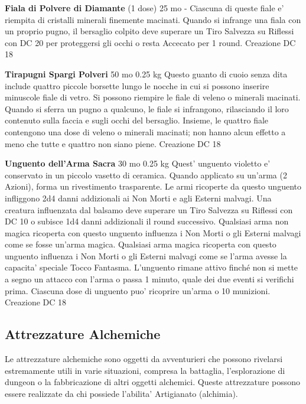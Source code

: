 \documentclass[a4paper,11pt,twoside,openany]{book}
\begin{document}
{\textbf{Fiala di Polvere di Diamante} (1 dose) 25 mo - Ciascuna di queste fiale e' riempita di cristalli minerali finemente macinati. Quando si infrange una fiala con un proprio pugno, il bersaglio colpito deve superare un Tiro Salvezza su Riflessi con DC 20 per proteggersi gli occhi o resta Accecato per 1 round. Creazione DC 18

\textbf{Tirapugni Spargi Polveri} 50 mo 0.25 kg Questo guanto di cuoio senza dita include quattro piccole borsette lungo le nocche in cui si possono inserire minuscole fiale di vetro. Si possono riempire le fiale di veleno o minerali macinati. Quando si sferra un pugno a qualcuno, le fiale si infrangono, rilasciando il loro contenuto sulla faccia e sugli occhi del bersaglio. Insieme, le quattro fiale contengono una dose di veleno o minerali macinati; non hanno alcun effetto a meno che tutte e quattro non siano piene. Creazione DC 18

\textbf{Unguento dell'Arma Sacra} 30 mo 0.25 kg Quest' unguento violetto e' conservato in un piccolo vasetto di ceramica. Quando applicato su un'arma (2 Azioni), forma un rivestimento trasparente. Le armi ricoperte da questo unguento infliggono 2d4 danni addizionali ai Non Morti e agli Esterni malvagi. Una creatura influenzata dal balsamo deve superare un Tiro Salvezza su Riflessi con DC 10 o subisce 1d4 danni addizionali il round successivo. Qualsiasi arma non magica ricoperta con questo unguento influenza i Non Morti o gli Esterni malvagi come se fosse un'arma magica. Qualsiasi arma magica ricoperta con questo unguento influenza i Non Morti o gli Esterni malvagi come se l'arma avesse la capacita' speciale Tocco Fantasma. L'unguento rimane attivo finché non si mette a segno un attacco con l'arma o passa 1 minuto, quale dei due eventi si verifichi prima. Ciascuna dose di unguento puo' ricoprire un'arma o 10 munizioni. Creazione DC 18

\subsection{Attrezzature Alchemiche}

\label{attrezzature-alchemiche}

Le attrezzature alchemiche sono oggetti da avventurieri che possono rivelarsi estremamente utili in varie situazioni, compresa la battaglia, l'esplorazione di dungeon o la fabbricazione di altri oggetti alchemici. Queste attrezzature possono essere realizzate da chi possiede l'abilita' Artigianato (alchimia).

}
\end{document}
